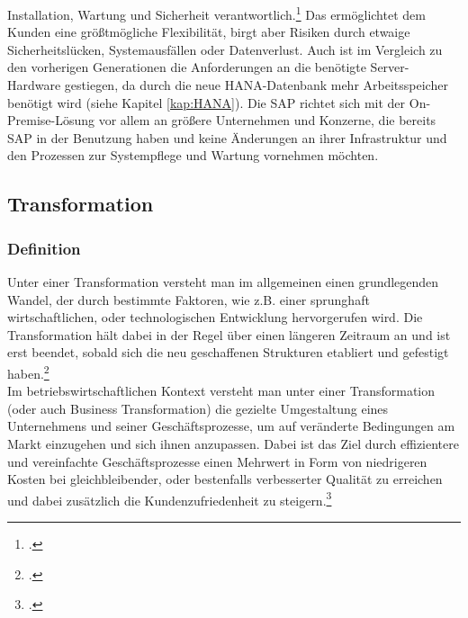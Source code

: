 Installation, Wartung und Sicherheit verantwortlich.\footcite[Vgl.][]{rz10-s4hana} Das ermöglichtet dem Kunden eine größtmögliche Flexibilität, birgt aber Risiken durch etwaige Sicherheitslücken, Systemausfällen oder Datenverlust. Auch ist im Vergleich zu den vorherigen Generationen die Anforderungen an die benötigte Server-Hardware gestiegen, da durch die neue HANA-Datenbank mehr Arbeitsspeicher benötigt wird (siehe Kapitel \ref{kap:HANA}). Die SAP richtet sich mit der On-Premise-Lösung vor allem an größere Unternehmen und Konzerne, die bereits SAP in der Benutzung haben und keine Änderungen an ihrer Infrastruktur und den Prozessen zur Systempflege und Wartung vornehmen möchten.  

\subsection{Transformation}
\subsubsection{Definition}
Unter einer Transformation versteht man im allgemeinen einen grundlegenden Wandel, der durch bestimmte Faktoren, wie z.B. einer sprunghaft wirtschaftlichen, oder technologischen Entwicklung hervorgerufen wird. Die Transformation hält dabei in der Regel über einen längeren Zeitraum an und ist erst beendet, sobald sich die neu geschaffenen Strukturen etabliert und gefestigt haben.\footcite[Vgl.][]{difu}\\ Im betriebswirtschaftlichen Kontext versteht man unter einer Transformation (oder auch Business Transformation) die gezielte Umgestaltung eines Unternehmens und seiner Geschäftsprozesse, um auf veränderte Bedingungen am Markt einzugehen und sich ihnen anzupassen. Dabei ist das Ziel durch effizientere und vereinfachte Geschäftsprozesse einen Mehrwert in Form von niedrigeren Kosten bei gleichbleibender, oder bestenfalls verbesserter Qualität zu erreichen und dabei zusätzlich die Kundenzufriedenheit zu steigern.\footcite[Vgl.][]{leanix}

